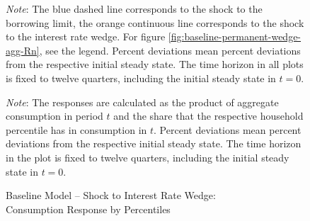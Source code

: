 \documentclass[a4paper,12pt]{article} %
\numberwithin{equation}{section} %
\numberwithin{figure}{section}
\numberwithin{table}{section}
\begin{document}
\begin{refsection}
\begin{appendices}
\begin{figure}[H]
     \vspace{5pt}

     \begin{minipage}{\textwidth} 
    \footnotesize
    \textit{Note}: The blue dashed line corresponds to the shock to the borrowing limit, the orange continuous line corresponds to the shock to the interest rate wedge. For figure \ref{fig:baseline-permanent-wedge-agg-Rn}, see the legend. Percent deviations mean percent deviations from the respective initial steady state. The time horizon in all plots is fixed to twelve quarters, including the initial steady state in $t=0$.
	\end{minipage}
\end{figure}

\begin{figure}[H]
    \centering
    \caption{Baseline Model -- Shock to Interest Rate Wedge: \\ Consumption Response by Percentiles}
    \label{fig:baseline-permanent-wedge-dist-c-response}
    
    
    \vspace{10pt}
    
    \begin{minipage}{0.75\textwidth} 
    \footnotesize
    \textit{Note}: The responses are calculated as the product of aggregate consumption in period $t$ and the share that the respective household percentile has in consumption in $t$. Percent deviations mean percent deviations from the respective initial steady state. The time horizon in the plot is fixed to twelve quarters, including the initial steady state in $t=0$.
    \end{minipage}
\end{figure}


\end{appendices}
\end{refsection}
\end{document}

